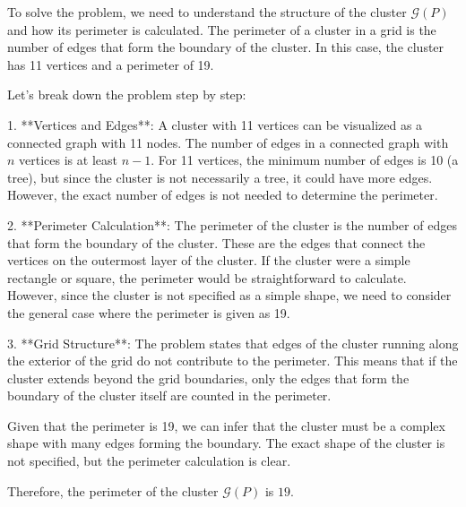 To solve the problem, we need to understand the structure of the cluster \(\mathcal{G}(P)\) and how its perimeter is calculated. The perimeter of a cluster in a grid is the number of edges that form the boundary of the cluster. In this case, the cluster has 11 vertices and a perimeter of 19.

Let's break down the problem step by step:

1. **Vertices and Edges**: A cluster with 11 vertices can be visualized as a connected graph with 11 nodes. The number of edges in a connected graph with \(n\) vertices is at least \(n-1\). For 11 vertices, the minimum number of edges is 10 (a tree), but since the cluster is not necessarily a tree, it could have more edges. However, the exact number of edges is not needed to determine the perimeter.

2. **Perimeter Calculation**: The perimeter of the cluster is the number of edges that form the boundary of the cluster. These are the edges that connect the vertices on the outermost layer of the cluster. If the cluster were a simple rectangle or square, the perimeter would be straightforward to calculate. However, since the cluster is not specified as a simple shape, we need to consider the general case where the perimeter is given as 19.

3. **Grid Structure**: The problem states that edges of the cluster running along the exterior of the grid do not contribute to the perimeter. This means that if the cluster extends beyond the grid boundaries, only the edges that form the boundary of the cluster itself are counted in the perimeter.

Given that the perimeter is 19, we can infer that the cluster must be a complex shape with many edges forming the boundary. The exact shape of the cluster is not specified, but the perimeter calculation is clear.

Therefore, the perimeter of the cluster \(\mathcal{G}(P)\) is \(\boxed{19}\).